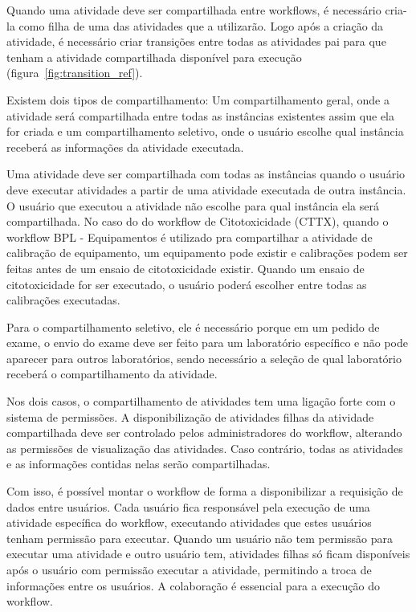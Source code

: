 Quando uma atividade deve ser compartilhada entre workflows, é necessário cria-la como filha de uma das atividades que a utilizarão. Logo após a criação da atividade, é necessário criar transições entre todas as atividades pai para que tenham a atividade compartilhada disponível para execução (figura~\ref{fig:transition_ref}).

Existem dois tipos de compartilhamento: Um compartilhamento geral, onde a atividade será compartilhada entre todas as instâncias existentes assim que ela for criada e um compartilhamento seletivo, onde o usuário escolhe qual instância receberá as informações da atividade executada.

Uma atividade deve ser compartilhada com todas as instâncias quando o usuário deve executar atividades a partir de uma atividade executada de outra instância. O usuário que executou a atividade não escolhe para qual instância ela será compartilhada. No caso do do workflow de Citotoxicidade (CTTX), quando o workflow BPL - Equipamentos é utilizado pra compartilhar a atividade de calibração de equipamento, um equipamento pode existir e calibrações podem ser feitas antes de um ensaio de citotoxicidade existir. Quando um ensaio de citotoxicidade for ser executado, o usuário poderá escolher entre todas as calibrações executadas.

Para o compartilhamento seletivo, ele é necessário porque em um pedido de exame, o envio do exame deve ser feito para um laboratório específico e não pode aparecer para outros laboratórios, sendo necessário a seleção de qual laboratório receberá o compartilhamento da atividade.

Nos dois casos, o compartilhamento de atividades tem uma ligação forte com o sistema de permissões. A disponibilização de atividades filhas da atividade compartilhada deve ser controlado pelos administradores do workflow, alterando as permissões de visualização das atividades. Caso contrário, todas as atividades e as informações contidas nelas serão compartilhadas.

Com isso, é possível montar o workflow de forma a disponibilizar a requisição de dados entre usuários. Cada usuário fica responsável pela execução de uma atividade específica do workflow, executando atividades que estes usuários tenham permissão para executar. Quando um usuário não tem permissão para executar uma atividade e outro usuário tem, atividades filhas só ficam disponíveis após o usuário com permissão executar a atividade, permitindo a troca de informações entre os usuários. A colaboração é essencial para a execução do workflow.

